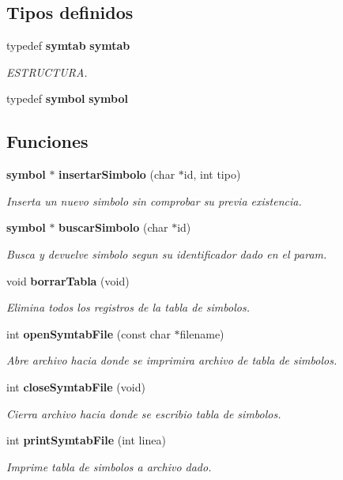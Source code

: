 \subsection*{Tipos definidos}
\begin{CompactItemize}
\item 
typedef {\bf symtab} {\bf symtab}
\begin{CompactList}\small\item\em ESTRUCTURA. \item\end{CompactList}\item 
typedef {\bf symbol} {\bf symbol}
\end{CompactItemize}
\subsection*{Funciones}
\begin{CompactItemize}
\item 
{\bf symbol} $\ast$ {\bf insertar\-Simbolo} (char $\ast$id, int tipo)
\begin{CompactList}\small\item\em Inserta un nuevo simbolo sin comprobar su previa existencia. \item\end{CompactList}\item 
{\bf symbol} $\ast$ {\bf buscar\-Simbolo} (char $\ast$id)
\begin{CompactList}\small\item\em Busca y devuelve simbolo segun su identificador dado en el param. \item\end{CompactList}\item 
void {\bf borrar\-Tabla} (void)
\begin{CompactList}\small\item\em Elimina todos los registros de la tabla de simbolos. \item\end{CompactList}\item 
int {\bf open\-Symtab\-File} (const char $\ast$filename)
\begin{CompactList}\small\item\em Abre archivo hacia donde se imprimira archivo de tabla de simbolos. \item\end{CompactList}\item 
int {\bf close\-Symtab\-File} (void)
\begin{CompactList}\small\item\em Cierra archivo hacia donde se escribio tabla de simbolos. \item\end{CompactList}\item 
int {\bf print\-Symtab\-File} (int linea)
\begin{CompactList}\small\item\em Imprime tabla de simbolos a archivo dado. \item\end{CompactList}\end{CompactItemize}


